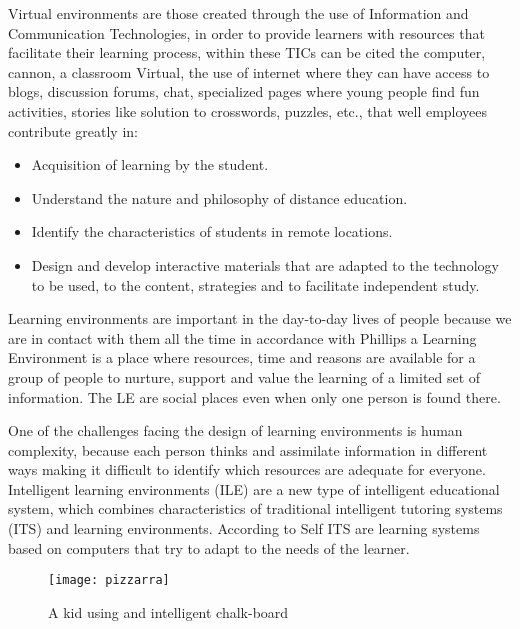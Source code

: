 Virtual environments are those created through the use of Information and Communication Technologies, in order to provide learners with resources that facilitate their learning process, within these TICs can be cited the computer, cannon, a classroom Virtual, the use of internet where they can have access to blogs, discussion forums, chat, specialized pages where young people find fun activities, stories like solution to crosswords, puzzles, etc., that well employees contribute greatly in:
\begin{itemize}	
\item Acquisition of learning by the student.
\item Understand the nature and philosophy of distance education.
\item Identify the characteristics of students in remote locations.
\item Design and develop interactive materials that are adapted to the technology to be used, to the content, strategies and to facilitate independent study.
\end{itemize}
Learning environments are important in the day-to-day lives of people because we are in contact with them all the time in accordance with Phillips\citep{PhilMcNaKenn2010zx} a Learning Environment is a place where resources, time and reasons are available for a group of people to nurture, support and value the learning of a limited set of information. The LE are social places even when only one person is found there. 



One of the challenges facing the design of learning environments is human complexity, because each person thinks and assimilate information in different ways making it difficult to identify which resources are adequate for everyone. Intelligent learning environments (ILE) are a new type of intelligent educational system, which combines characteristics of traditional intelligent tutoring systems (ITS) \citep{john1991} and learning environments. According to Self \cite{self1998} ITS are learning systems based on computers that try to adapt to the needs of the learner. 
\begin{figure}[ht!]  
\centering  
\texttt{[image: pizzarra]}
\quad  
\caption{A kid using and intelligent chalk-board}  
\label{name}  
\end{figure}

